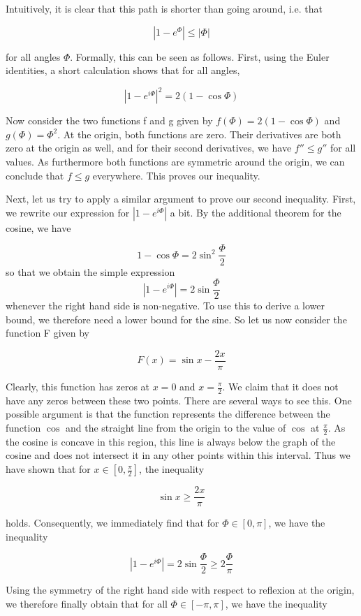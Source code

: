 \documentclass[a4paper, draft]{article}
\theoremstyle{own}
\theoremstyle{remark}
\begin{document}
Intuitively, it is clear that this path is shorter than going around, i.e. that 

$$
| 1 - e^{\Phi} | \leq |\Phi|
$$

for all angles $\Phi$. Formally, this can be seen as follows. First, using the Euler identities, a short calculation shows that for all angles,

$$
|1 - e^{i\Phi}|^2 = 2(1 - \cos \Phi)
$$

Now consider the two functions f and g given by $f(\Phi) = 2(1 - \cos \Phi)$ and $g(\Phi)  = \Phi^2$. At the origin, both functions are zero. Their derivatives are both zero at the origin as well, and for their second derivatives, we have $f'' \leq g''$ for all values. As furthermore both functions are symmetric around the origin, we can conclude that $f \leq g$ everywhere. This proves our inequality.

Next, let us try to apply a similar argument to prove our second inequality. First, we rewrite our expression for $|1 - e^{i\Phi}|$ a bit. By the additional theorem for the cosine, we have

$$
1 - \cos \Phi = 2 \sin^2 \frac{\Phi}{2}
$$
so that we obtain the simple expression
$$
| 1- e^{i\Phi}| = 2 \sin \frac{\Phi}{2}
$$
whenever the right hand side is non-negative. To use this to derive a lower bound, we therefore need a lower bound for the sine. So let us now consider the function F given by

$$
F(x) = \sin x - \frac{2x}{\pi}
$$

Clearly, this function has zeros at $x = 0$ and $x = \frac{\pi}{2}$. We claim that it does not have any zeros between these two points. There are several ways to see this. One possible argument is that the function represents the difference between the function $\cos $ and the straight line from the origin to the value of $\cos$ at $\frac{\pi}{2}$. As the cosine is concave in this region, this line is always below the graph of the cosine and does not intersect it in any other points within this interval. Thus we have shown that for $x \in [0,\frac{\pi}{2}]$, the inequality

$$
\sin x \geq \frac{2x}{\pi}
$$

holds. Consequently, we immediately find that for $\Phi \in [0,\pi]$, we have the inequality

$$
| 1- e^{i\Phi}| = 2 \sin \frac{\Phi}{2}  \geq 2 \frac{\Phi}{\pi}
$$

Using the symmetry of the right hand side with respect to reflexion at the origin, we therefore finally obtain that for all $\Phi \in [-\pi, \pi]$, we have the inequality
\end{document}
